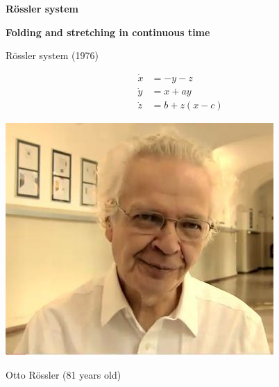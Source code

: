 \documentclass[usenames, dvipsnames, aspectratio=169]{beamer}
\begin{document}
{



  \begin{frame}[fragile]{}{}
    \vfill
    \centering
    \Large
    \textbf{\color{black} R\"ossler system}

    \bigskip

    \large
    \textbf{\color{gray} Folding and stretching in continuous time}
    \vfill
  \end{frame}
}

\begin{frame}[t, c]{R\"ossler system (1976)}{}
  \vfill
  \large

  \begin{minipage}{.48\textwidth}
    \[
    \begin{aligned}
      \dot{x} & = -y-z \\
      \dot{y} & = x + a y \\
      \dot{z} & = b + z(x-c)
    \end{aligned}
    \]
  \end{minipage}%
  \hfill
  \begin{minipage}{.48\textwidth}
    \centering
    \includegraphics[width=.75\textwidth]{otto_rossler} \\

    \bigskip

    \tiny
    Otto R\"ossler (81 years old)
  \end{minipage}

  \vfill
\end{frame}
\end{document}
